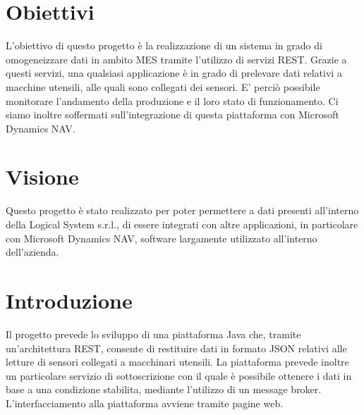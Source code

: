 \begin{titlepage}





 

\vfill %

\end{titlepage}
\section{Obiettivi}
L'obiettivo di questo progetto è la realizzazione di un sistema in grado di omogeneizzare dati in ambito MES tramite l'utilizzo di servizi REST. Grazie a questi servizi, una qualsiasi applicazione è in grado di prelevare dati relativi a macchine utensili, alle quali sono collegati dei sensori. E' perciò possibile monitorare l'andamento della produzione e il loro stato di funzionamento. Ci siamo inoltre soffermati sull'integrazione di questa piattaforma con Microsoft Dynamics NAV.
\section{Visione}
Questo progetto è stato realizzato per poter permettere a dati presenti all'interno della Logical System s.r.l., di essere integrati con altre applicazioni, in particolare con Microsoft Dynamics NAV, software largamente utilizzato all'interno dell'azienda.
\section{Introduzione}
Il progetto prevede lo sviluppo di una piattaforma Java che, tramite un'architettura REST, consente di restituire dati in formato JSON relativi alle letture di sensori collegati a macchinari utensili. La piattaforma prevede inoltre un particolare servizio di sottoscrizione con il quale è possibile ottenere i dati in base a una condizione stabilita, mediante l’utilizzo di un message broker. L’interfacciamento alla piattaforma avviene tramite pagine web.
\clearpage

